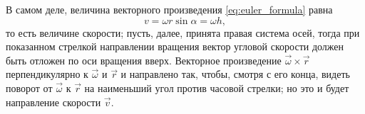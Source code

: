 \begin{figure}[H]
  \centering

  \caption{}
  \label{fig:dihedral_angle}
\end{figure}

В самом деле, величина векторного произведения \ref{eq:euler_formula} равна
\begin{equation*}
  v = \omega r \sin \alpha = \omega h,
\end{equation*}
то есть величине скорости; пусть, далее, принята правая система осей, тогда при
показанном стрелкой направлении вращения вектор угловой скорости должен быть
отложен по оси вращения вверх. Векторное произведение
$\vec{\omega} \times \vec{r}$ перпендикулярно к $\vec{\omega}$ и $\vec{r}$ и
направлено так, чтобы, смотря с его конца, видеть поворот от $\vec{\omega}$ к
$\vec{r}$ на наименьший угол против часовой стрелки; но это и будет направление
скорости $\vec{v}$.

